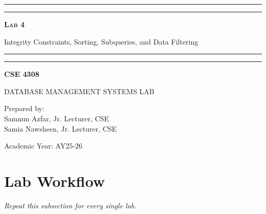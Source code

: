 \documentclass[12pt,a4paper]{article}
\newcommand{\labNo}{Lab 4}
\newcommand{\labTopic}{Integrity Constraints, Sorting, Subqueries, and Data Filtering}
\newcommand{\courseCode}{CSE 4308}
\newcommand{\courseTitleLong}{DATABASE MANAGEMENT SYSTEMS LAB}
\newcommand{\instructorName}{Samnun Azfar, Jr. Lecturer, CSE\\ Samia Nawsheen, Jr. Lecturer, CSE}
\newcommand{\academicYear}{AY25-26}
\begin{document}
\begin{titlepage}
    \centering
    \vspace*{2\baselineskip}

    \rule{14cm}{2pt}\vspace*{-0.8\baselineskip}\vspace*{1.5pt}
    \rule{14cm}{0.5pt}\vspace{2\baselineskip}

    {\Huge\bfseries\scshape \labNo\par} %
    \vspace{3mm}
    {\Large \labTopic} %
    \vspace{3mm}

    \rule{14cm}{0.5pt}\vspace*{-0.7\baselineskip}\vspace{2.5pt}
    \rule{14cm}{2pt}

    \vspace{2\baselineskip}

    {\Large\bfseries \courseCode\par} %
    \vspace{1\baselineskip}
    {\large \courseTitleLong\par} %

    \vfill
    {\normalsize Prepared by:\\ \instructorName\par} %
    {\normalsize Academic Year: \academicYear\par} %
\end{titlepage}

\newpage
\tableofcontents
\newpage

\section*{Lab Workflow}



\textit{Repeat this subsection for every single lab.}
\end{document}
